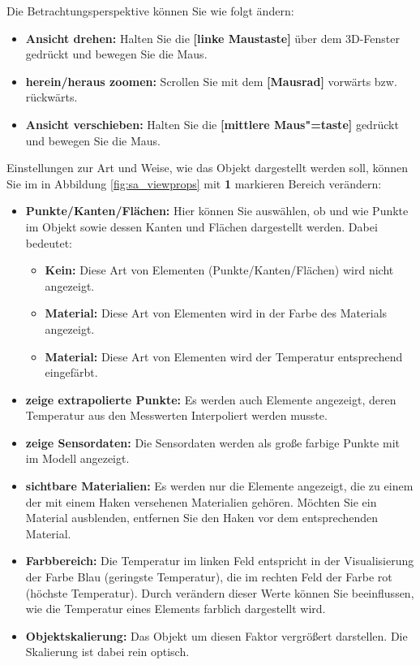 \documentclass[10pt,a5paper,twoside,titlepage]{scrartcl}
\begin{document}
	Die Betrachtungsperspektive können Sie wie folgt ändern:
	\begin{itemize}
	\item \textbf{Ansicht drehen:} Halten Sie die \textbf{[linke Maustaste]} über dem 3D-Fenster gedrückt und bewegen Sie die Maus.
	\item \textbf{herein/heraus zoomen:} Scrollen Sie mit dem \textbf{[Mausrad]} vorwärts bzw. rückwärts.
 	\item \textbf{Ansicht verschieben:} Halten Sie die \textbf{[mittlere Maus"=taste]} gedrückt und bewegen Sie die Maus.
	\end{itemize}
	Einstellungen zur Art und Weise, wie das Objekt dargestellt werden soll, können Sie im in Abbildung \ref{fig:sa_viewprops} mit \textbf{1} markieren Bereich verändern:
	\begin{itemize}
	\item \textbf{Punkte/Kanten/Flächen:} Hier können Sie auswählen, ob und wie Punkte im Objekt sowie dessen Kanten und Flächen dargestellt werden. Dabei bedeutet:
	\begin{itemize}
	\item \textbf{Kein:} Diese Art von Elementen (Punkte/Kanten/Flächen) wird nicht angezeigt.
	\item \textbf{Material:} Diese Art von Elementen wird in der Farbe des Materials angezeigt.
	\item \textbf{Material:} Diese Art von Elementen wird der Temperatur entsprechend eingefärbt.
	\end{itemize}
	\item \textbf{zeige extrapolierte Punkte:} Es werden auch Elemente angezeigt, deren Temperatur aus den Messwerten Interpoliert werden musste.
	\item \textbf{zeige Sensordaten:} Die Sensordaten werden als große farbige Punkte mit im Modell angezeigt.
	\item \textbf{sichtbare Materialien:} Es werden nur die Elemente angezeigt, die zu einem der mit einem Haken versehenen Materialien gehören. Möchten Sie ein Material ausblenden, entfernen Sie den Haken vor dem entsprechenden Material.
	\item \textbf{Farbbereich:} Die Temperatur im linken Feld entspricht in der Visualisierung der Farbe Blau (geringste Temperatur), die im rechten Feld der Farbe rot (höchste Temperatur). Durch verändern dieser Werte können Sie beeinflussen, wie die Temperatur eines Elements farblich dargestellt wird.
	\item \textbf{Objektskalierung:} Das Objekt um diesen Faktor vergrößert darstellen. Die Skalierung ist dabei rein optisch.
	\end{itemize}
	\newpage
\end{document}
